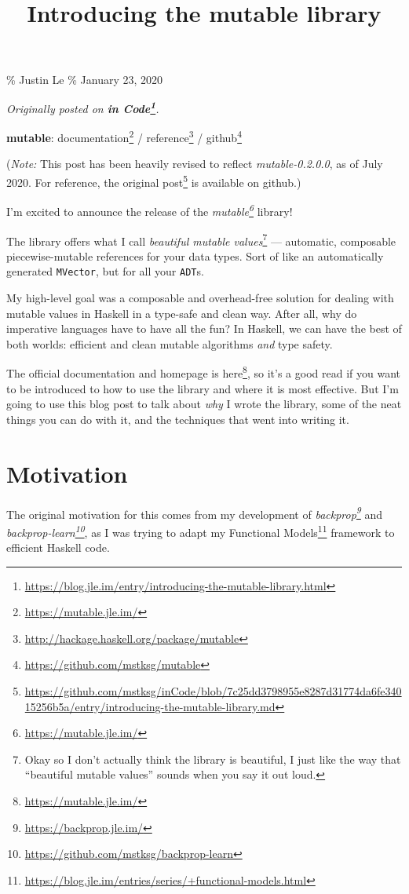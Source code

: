 \documentclass[]{article}
\title{Introducing the mutable library}
\renewcommand{\href}[2]{#2\footnote{\url{#1}}}
\begin{document}
\maketitle

\% Justin Le \% January 23, 2020

\emph{Originally posted on
\textbf{\href{https://blog.jle.im/entry/introducing-the-mutable-library.html}{in
Code}}.}

\textbf{mutable}: \href{https://mutable.jle.im/}{documentation} /
\href{http://hackage.haskell.org/package/mutable}{reference} /
\href{https://github.com/mstksg/mutable}{github}

(\emph{Note:} This post has been heavily revised to reflect
\emph{mutable-0.2.0.0}, as of July 2020. For reference,
\href{https://github.com/mstksg/inCode/blob/7c25dd3798955e8287d31774da6fe34015256b5a/entry/introducing-the-mutable-library.md}{the
original post} is available on github.)

I'm excited to announce the release of the
\emph{\href{https://mutable.jle.im/}{mutable}} library!

The library offers what I call \emph{beautiful mutable values}\footnote{Okay so
  I don't actually think the library is beautiful, I just like the way that
  ``beautiful mutable values'' sounds when you say it out loud.} --- automatic,
composable piecewise-mutable references for your data types. Sort of like an
automatically generated \texttt{MVector}, but for all your \texttt{ADT}s.

My high-level goal was a composable and overhead-free solution for dealing with
mutable values in Haskell in a type-safe and clean way. After all, why do
imperative languages have to have all the fun? In Haskell, we can have the best
of both worlds: efficient and clean mutable algorithms \emph{and} type safety.

The \href{https://mutable.jle.im/}{official documentation and homepage is here},
so it's a good read if you want to be introduced to how to use the library and
where it is most effective. But I'm going to use this blog post to talk about
\emph{why} I wrote the library, some of the neat things you can do with it, and
the techniques that went into writing it.

\section{Motivation}\label{motivation}

The original motivation for this comes from my development of
\emph{\href{https://backprop.jle.im/}{backprop}} and
\emph{\href{https://github.com/mstksg/backprop-learn}{backprop-learn}}, as I was
trying to adapt my
\href{https://blog.jle.im/entries/series/+functional-models.html}{Functional
Models} framework to efficient Haskell code.
\end{document}
